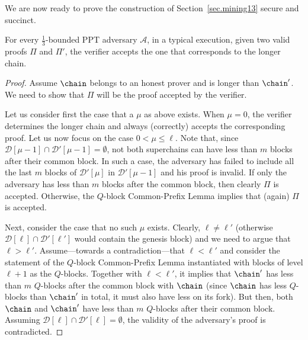 We are now ready to prove the construction of Section~\ref{sec.mining13} secure
and succinct.

\begin{theorem}
	For every $\frac{1}{3}$-bounded PPT adversary $\mathcal{A}$,
	in a typical execution,
	given two valid proofs $\Pi$ and $\Pi'$, the
	verifier accepts the one that corresponds to the longer chain.
\end{theorem}
\begin{proof}
	Assume $\chain$ belongs to an honest prover and is longer than $\chain'$. We
	need to show that $\Pi$ will be the proof accepted by the verifier.

	Let us consider first the case that a $\mu$ as above exists.
	When $\mu=0$, the verifier determines the longer chain and always
	(correctly) accepts the corresponding proof.
	Let us now focus on the case $0<\mu\leq\ell$.
	Note that, since $\mathcal{D}[\mu-1]\cap\mathcal{D}'[\mu-1]=\emptyset$, not both
	superchains can have less than $m$ blocks after their common block. In such
	a case, the adversary has failed to include all the last $m$ blocks of
	$\mathcal{D}'[\mu]$ in $\mathcal{D}'[\mu-1]$ and his proof is invalid.
	If only the adversary has less than $m$ blocks after the common block, then
	clearly $\Pi$ is accepted. Otherwise, the $Q$-block Common-Prefix Lemma
	implies that (again) $\Pi$ is accepted.

	Next, consider the case that no such $\mu$ exists.
	Clearly, $\ell\ne\ell'$ (otherwise $\mathcal{D}[\ell]\cap\mathcal{D}'[\ell']$ would
	contain the genesis block) and we need to argue that $\ell>\ell'$.
	Assume---towards a contradiction---that $\ell<\ell'$ and consider the
	statement of the $Q$-block Common-Prefix Lemma instantiated with blocks of
	level $\ell+1$ as the $Q$-blocks.
	Together with $\ell<\ell'$, it implies that $\chain'$ has less than $m$
	$Q$-blocks after the common block with $\chain$ (since $\chain$ has less
	$Q$-blocks than $\chain'$ in total, it must also have less on its fork).
	But then, both $\chain$ and $\chain'$ have less than $m$ $Q$-blocks after
	their common block. Assuming $\mathcal{D}[\ell]\cap\mathcal{D}'[\ell]=\emptyset$, the
	validity of the adversary's proof is contradicted.
\end{proof}

